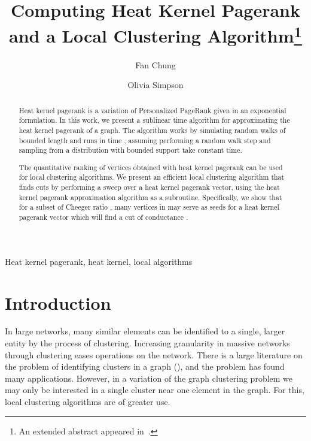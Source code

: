 \documentclass[runningheads,a4paper]{llncs}
\newcommand{\keywords}[1]{\par\addvspace\baselineskip
\noindent\keywordname\enspace\ignorespaces#1}
\begin{document}
\mainmatter

\title{Computing Heat Kernel Pagerank and a Local Clustering
Algorithm\footnote{An extended abstract appeared in~\cite{chung2014computing}.}}

\author{Fan Chung
\and Olivia Simpson}


\maketitle

\begin{abstract}
Heat kernel pagerank is a variation of Personalized PageRank given in an
exponential formulation.  In this work, we present a sublinear time algorithm
for approximating the heat kernel pagerank of a graph.  The algorithm works by
simulating random walks of bounded length and runs in time ,
assuming performing a random walk step and sampling from a distribution with
bounded support take constant time.

The quantitative ranking of vertices obtained with heat kernel pagerank can be
used for local clustering algorithms.  We present an efficient local clustering
algorithm that finds cuts by performing a sweep over a heat kernel pagerank
vector, using the heat kernel pagerank approximation algorithm as a subroutine.
Specifically, we show that for a subset  of Cheeger ratio , many
vertices in  may serve as seeds for a heat kernel pagerank vector which will
find a cut of conductance .
\end{abstract}
\keywords{Heat kernel pagerank, heat kernel, local algorithms}

\section{Introduction}
\label{sec:introduction}
In large networks, many similar elements can be identified to a single, larger
entity by the process of clustering.  Increasing granularity in massive networks
through clustering eases operations on the network.  There is a large literature
on the problem of identifying clusters in a graph
(\cite{csz:spectralkway:94,shi2000normalized,njw:spectralcluster:02,kvv:clusterings:04,lc:powercluster:10,lc:textcluster:10}),
and the problem has found many applications.  However, in a variation of the
graph clustering problem we may only be interested in a single cluster near one
element in the graph.  For this, local clustering algorithms are of greater use.
\end{document}
